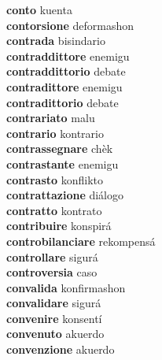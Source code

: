\textbf{conto } kuenta \\
\textbf{contorsione } deformashon \\
\textbf{contrada } bisindario \\
\textbf{contraddittore } enemigu \\
\textbf{contraddittorio } debate \\
\textbf{contradittore } enemigu \\
\textbf{contradittorio } debate \\
\textbf{contrariato } malu \\
\textbf{contrario } kontrario \\
\textbf{contrassegnare } chèk \\
\textbf{contrastante } enemigu \\
\textbf{contrasto } konflikto \\
\textbf{contrattazione } diálogo \\
\textbf{contratto } kontrato \\
\textbf{contribuire } konspirá \\
\textbf{controbilanciare } rekompensá \\
\textbf{controllare } sigurá \\
\textbf{controversia } caso \\
\textbf{convalida } konfirmashon \\
\textbf{convalidare } sigurá \\
\textbf{convenire } konsentí \\
\textbf{convenuto } akuerdo \\
\textbf{convenzione } akuerdo \\
